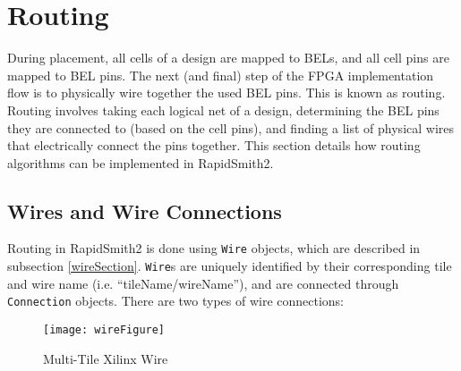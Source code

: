 \newpage
\section{Routing} \label{sec:routing}
During placement, all cells of a design are mapped to BELs, and all
cell pins are mapped to BEL pins. The next (and final) step of the
FPGA implementation flow is to physically wire together the used BEL pins. This
is known as routing. Routing involves taking each logical net of a design,
determining the BEL pins they are connected to (based on the cell pins), and
finding a list of physical wires that electrically connect the pins together.
This section details how routing algorithms can be implemented in RapidSmith2.

\subsection{Wires and Wire Connections} \label{wireConnSection}
Routing in RapidSmith2 is done using \texttt{Wire} objects, which are described
in subsection \ref{wireSection}. \texttt{Wire}s are uniquely identified by
their corresponding tile and wire name (i.e. ``tileName/wireName''), and are connected
through \texttt{Connection} objects. There are two types of wire connections:

\begin{figure}[b]
\centering
\texttt{[image: wireFigure]}
\caption{Multi-Tile Xilinx Wire}
\label{fig:wireFigure}
\end{figure}

